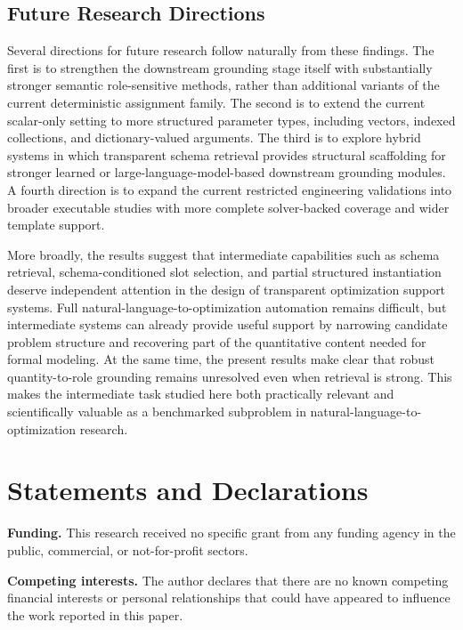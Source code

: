 \documentclass[pdflatex,sn-basic,Numbered]{sn-jnl}
\begin{document}
\subsection{Future Research Directions}
\label{subsec:future_work}

Several directions for future research follow naturally from these findings. The first is to strengthen the downstream grounding stage itself with substantially stronger semantic role-sensitive methods, rather than additional variants of the current deterministic assignment family. The second is to extend the current scalar-only setting to more structured parameter types, including vectors, indexed collections, and dictionary-valued arguments. The third is to explore hybrid systems in which transparent schema retrieval provides structural scaffolding for stronger learned or large-language-model-based downstream grounding modules. A fourth direction is to expand the current restricted engineering validations into broader executable studies with more complete solver-backed coverage and wider template support.

More broadly, the results suggest that intermediate capabilities such as schema retrieval, schema-conditioned slot selection, and partial structured instantiation deserve independent attention in the design of transparent optimization support systems. Full natural-language-to-optimization automation remains difficult, but intermediate systems can already provide useful support by narrowing candidate problem structure and recovering part of the quantitative content needed for formal modeling. At the same time, the present results make clear that robust quantity-to-role grounding remains unresolved even when retrieval is strong. This makes the intermediate task studied here both practically relevant and scientifically valuable as a benchmarked subproblem in natural-language-to-optimization research.

\backmatter

\section*{Statements and Declarations}

\noindent\textbf{Funding.} This research received no specific grant from any funding agency in the public, commercial, or not-for-profit sectors.

\noindent\textbf{Competing interests.} The author declares that there are no known competing financial interests or personal relationships that could have appeared to influence the work reported in this paper.
\end{document}
